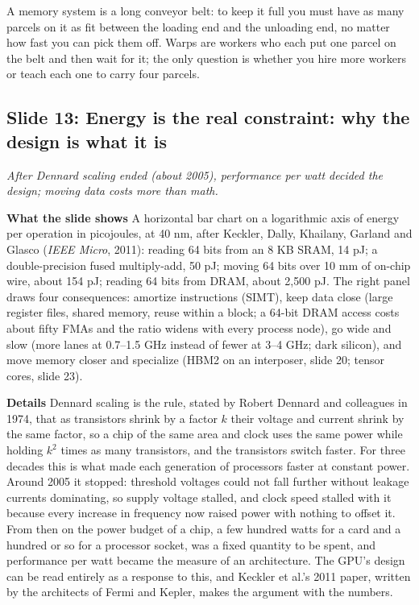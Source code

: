 \documentclass[11pt,letterpaper]{article}
\newcommand{\slide}[3]{%
  \subsection[Slide #1: #2]{Slide #1: #2}%
  {\color{muted}\itshape #3\par}\medskip}
\newcommand{\para}[1]{\medskip\noindent\textbf{#1}\quad}
\newenvironment{intuition}{\begin{tcolorbox}[intuitionbox]}{\end{tcolorbox}}
\begin{document}
\begin{intuition}
A memory system is a long conveyor belt: to keep it full you must have as many parcels on it as fit between the loading end and the unloading end, no matter how fast you can pick them off. Warps are workers who each put one parcel on the belt and then wait for it; the only question is whether you hire more workers or teach each one to carry four parcels.
\end{intuition}

\slide{13}{Energy is the real constraint: why the design is what it is}{After Dennard scaling ended (about 2005), performance per watt decided the design; moving data costs more than math.}

\para{What the slide shows} A horizontal bar chart on a logarithmic axis of energy per operation in picojoules, at 40 nm, after Keckler, Dally, Khailany, Garland and Glasco (\emph{IEEE Micro}, 2011): reading 64 bits from an 8 KB SRAM, 14 pJ; a double-precision fused multiply-add, 50 pJ; moving 64 bits over 10 mm of on-chip wire, about 154 pJ; reading 64 bits from DRAM, about 2,500 pJ. The right panel draws four consequences: amortize instructions (SIMT), keep data close (large register files, shared memory, reuse within a block; a 64-bit DRAM access costs about fifty FMAs and the ratio widens with every process node), go wide and slow (more lanes at 0.7--1.5 GHz instead of fewer at 3--4 GHz; dark silicon), and move memory closer and specialize (HBM2 on an interposer, slide 20; tensor cores, slide 23).

\para{Details} Dennard scaling is the rule, stated by Robert Dennard and colleagues in 1974, that as transistors shrink by a factor $k$ their voltage and current shrink by the same factor, so a chip of the same area and clock uses the same power while holding $k^2$ times as many transistors, and the transistors switch faster. For three decades this is what made each generation of processors faster at constant power. Around 2005 it stopped: threshold voltages could not fall further without leakage currents dominating, so supply voltage stalled, and clock speed stalled with it because every increase in frequency now raised power with nothing to offset it. From then on the power budget of a chip, a few hundred watts for a card and a hundred or so for a processor socket, was a fixed quantity to be spent, and performance per watt became the measure of an architecture. The GPU's design can be read entirely as a response to this, and Keckler et al.'s 2011 paper, written by the architects of Fermi and Kepler, makes the argument with the numbers.
\end{document}
